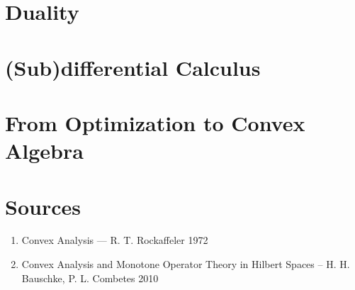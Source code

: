 \documentclass[12pt]{scrartcl}
\renewcommand{\.}{\; . \;}
\begin{document}
\section{Duality}
\section{(Sub)differential Calculus}
\section{From Optimization to Convex Algebra}
\section*{Sources}
\begin{enumerate}
\item Convex Analysis --- R. T. Rockaffeler  1972
\item Convex Analysis  and Monotone Operator Theory in Hilbert Spaces -- H. H. Bauschke, P. L. Combetes 2010

\end{enumerate}
\end{document}
